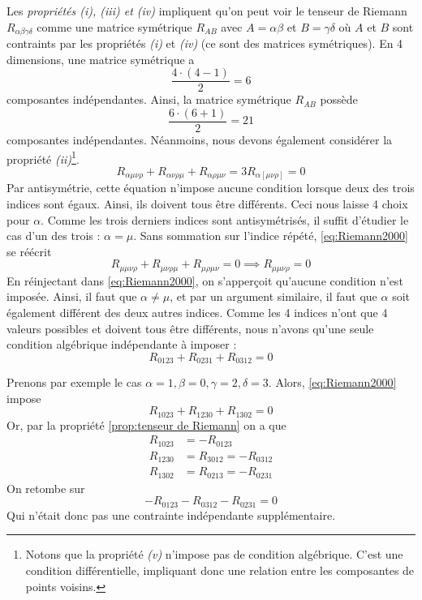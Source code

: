 Les \textit{propriétés (i), (iii) et (iv)} impliquent qu'on peut voir le tenseur de Riemann $R_{\alpha \beta \gamma \delta}$ comme une matrice symétrique $R_{AB}$ avec $A = \alpha \beta$ et $B = \gamma \delta$ où $A$ et $B$ sont contraints par les propriétés \emph{(i)} et \emph{(iv)} (ce sont des matrices symétriques). En 4 dimensions, une matrice symétrique a
\begin{equation*}
    \frac{4 \cdot (4-1)}{2} = 6
\end{equation*}
composantes indépendantes. Ainsi, la matrice symétrique $R_{AB}$ possède
\begin{equation*}
    \frac{6 \cdot (6+1)}{2} = 21
\end{equation*}
composantes indépendantes. Néanmoins, nous devons également considérer la propriété \emph{(ii)}\footnote{Notons que la propriété \emph{(v)} n'impose pas de condition algébrique. C'est une condition différentielle, impliquant donc une relation entre les composantes de points voisins.}.
\begin{equation}
    \label{eq:Riemann2000}
    R_{\alpha \mu \nu \rho} + R_{\alpha \nu \rho \mu} + R_{\alpha \rho \mu \nu}= 3 R_{\alpha[\mu\nu\rho]} = 0
\end{equation}
Par antisymétrie, cette équation n'impose aucune condition lorsque deux des trois indices sont égaux. Ainsi, ils doivent tous être différents. Ceci nous laisse 4 choix pour $\alpha$. Comme les trois derniers indices sont antisymétrisés, il suffit d'étudier le cas d'un des trois : $\alpha = \mu$. Sans sommation sur l'indice répété, \ref{eq:Riemann2000} se réécrit 
\begin{equation}
    R_{\mu\mu \nu\rho} + R_{\mu \nu \rho \mu}+ R_{\mu \rho \mu \nu}  = 0 \implies R_{\mu\mu \nu\rho} =0
\end{equation}
En réinjectant dans \ref{eq:Riemann2000}, on s'apperçoit qu'aucune condition n'est imposée. Ainsi, il faut que $\alpha \neq \mu$, et par un argument similaire, il faut que $\alpha$ soit également différent des deux autres indices. Comme les 4 indices n'ont que 4 valeurs possibles et doivent tous être différents, nous n'avons qu'une seule condition algébrique indépendante à imposer :
\begin{equation}
    R_{0123} + R_{0231} + R_{0312} = 0
\end{equation}
\begin{exmp}
    Prenons par exemple le cas $\alpha = 1, \beta =0, \gamma = 2, \delta = 3$. Alors, \ref{eq:Riemann2000} impose 
    \begin{equation}
        R_{1023} + R_{1230} + R_{1302} = 0
    \end{equation}
    Or, par la propriété \ref{prop:tenseur de Riemann} on a que
    \begin{align*}
        R_{1023} &= - R_{0123} \\
        R_{1230} &= R_{3012} = - R_{0312}\\
        R_{1302} &= R_{0213} = -R_{0231} 
    \end{align*}
    On retombe sur
    \begin{equation}
        - R_{0123} - R_{0312}-R_{0231}=0
    \end{equation}
    Qui n'était donc pas une contrainte indépendante supplémentaire.
\end{exmp}
